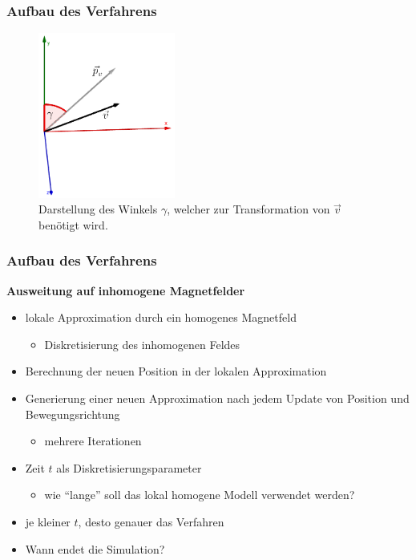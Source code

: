 \begin{frame}
  \frametitle{Aufbau des Verfahrens}
  \begin{figure}
    \centering
    \includegraphics[width=0.4\textwidth]{../geogebra/img/winkel_v_edited}
    \caption{Darstellung des Winkels \(\gamma\), welcher zur Transformation von \(\vec{v}\) ben\"otigt wird.}
    \label{fig:winkelv}
  \end{figure}
\end{frame}

\begin{frame}
  \frametitle{Aufbau des Verfahrens}
  \onslide<+->
  \textbf{Ausweitung auf inhomogene Magnetfelder}
  \begin{itemize}
    \item<+-> lokale Approximation durch ein homogenes Magnetfeld
      \begin{itemize}
        \item<+-> Diskretisierung des inhomogenen Feldes
      \end{itemize}
    \item<+-> Berechnung der neuen Position in der lokalen Approximation
    \item<+-> Generierung einer neuen Approximation nach jedem Update von Position und Bewegungsrichtung
      \begin{itemize}
        \item<+-> mehrere Iterationen
      \end{itemize}
    \item<+-> Zeit \(t\) als Diskretisierungsparameter
      \begin{itemize}
        \item<+-> wie "`lange"' soll das lokal homogene Modell verwendet werden?
      \end{itemize}
    \item<+-> je kleiner \(t\), desto genauer das Verfahren
    \item<+-> Wann endet die Simulation?
  \end{itemize}
\end{frame}

